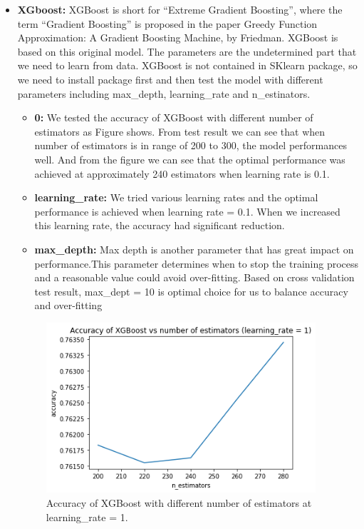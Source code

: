 \begin{itemize}
\begin{itemize}
    \item \textbf{XGboost:} XGBoost is short for “Extreme Gradient Boosting”, where the term “Gradient Boosting” is proposed in the paper Greedy Function Approximation: A Gradient Boosting Machine, by Friedman. XGBoost is based on this original model. The parameters are the undetermined part that we need to learn from data. XGBoost is not contained in SKlearn package, so we need to install package first and then test the model with different parameters including max_depth, learning_rate and n_estinators.
    
    \begin{itemize}
    \item \textbf{0:} We tested the accuracy of XGBoost with different number of estimators as Figure shows. From test result we can see that when number of estimators is in range of 200 to 300, the model performances well. And from the figure we can see that the optimal performance was achieved at approximately 240 estimators when learning rate is 0.1.
    \item \textbf{learning_rate:} We tried various learning rates and the optimal performance is achieved when learning rate = 0.1. When we increased this learning rate, the accuracy had significant reduction.
    \item \textbf{max_depth:} Max depth is another parameter that has great impact on performance.This parameter determines when to stop the training process and a reasonable value could avoid over-fitting. Based on cross validation test result, max_dept = 10 is optimal choice for us to balance accuracy and over-fitting
    \end{itemize}
   
    \begin{figure}[H]                           
    \centering
    \includegraphics[width=10cm]{XGBoost_lr=1.png}
    \caption{Accuracy of XGBoost with different number of estimators at learning_rate = 1.}
    \label{xg}
    \end{figure}
    

\end{itemize}
\end{itemize}
